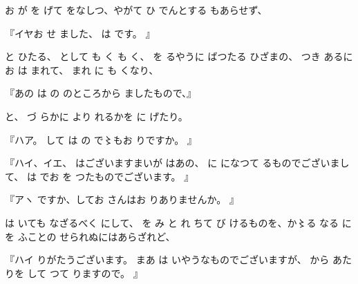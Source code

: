 
お
が
を
げて
をなしつ、やがて
ひ
でんとする
もあらせず、

『イヤお
せ
ました、
は
です。
』

と
ひたる、
として
も
く
も
く、
を
るやうに
ばつたる
ひざまの、
つき
あるにお
は
まれて、
まれ
に
も
くなり、

『あの
は
の
のところから
ましたもので、』

と、
づ
らかに
より
れるかを
に
げたり。

『ハア。
して
は
の
で〻もお
りですか。
』

『ハイ、イエ、
はございますまいが
はあの、
に
になつて
るものでございまして、
は
でお
を
つたものでございます。
』

『アヽ
ですか、してお
さんはお
りありませんか。
』

は
いても
なざるべく
にして、
を
み
と
れ
ちて
び
けるものを、か〻る
なる
に
を
ふことの
せられぬにはあらざれど、

『ハイ
りがたうございます。
まあ
は
いやうなものでございますが、
から
あたりを
して
つて
りますので。
』

